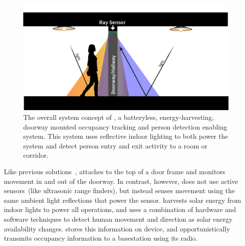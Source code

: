 \begin{figure}[t]
\centering
\includegraphics[width=\columnwidth]{figs/scenario2.png}
\caption{ The overall system concept of \sysname, a batteryless, energy-harvesting, doorway mounted occupancy tracking and person detection enabling system.  This system uses reflective indoor lighting to both power the system and detect person entry and exit activity to a room or corridor.\label{fig:syspic}}
\end{figure}

Like previous solutions~\cite{hnat2012doorjamb}, \sysname attaches to the top of a door frame and monitors movement in and out of the doorway.
In contrast, however, \sysname does not use active sensors~(like ultrasonic range finders), but instead senses movement using the same ambient light reflections that power the sensor.
\sysname harvests solar energy from indoor lights to power all operations, and uses a combination of hardware and software techniques to detect human movement and direction as solar energy availability changes.
\sysname stores this information on device, and opportunistically transmits occupancy information to a basestation using its radio.


